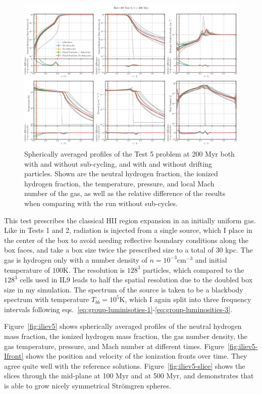 \begin{figure}
\centering
\includegraphics[width=\textwidth]{figures/RHD/Iliev5/compare_profiles_0020-RelativeDifferences.png}
\caption{
Spherically averaged profiles of the Test 5 problem at 200 Myr both with and without sub-cycling,
and with and without drifting particles. Shown are the neutral hydrogen fraction, the ionized
hydrogen fraction, the temperature, pressure, and local Mach number of the gas, as well as the
relative difference of the results when comparing with the run without sub-cycles.
}
\label{fig:iliev5-subcycling}
\end{figure}


This test prescribes the classical HII region expansion in an initially uniform gas. Like
in Tests 1 and 2, radiation is injected from a single source, which I place in the center of the
box to avoid needing reflective boundary conditions along the box faces, and take a box size twice
the prescribed size to a total of $30$ kpc. The gas is hydrogen only with a number density of $n =
10^{-3}$cm$^{-3}$ and initial temperature of $100$K. The resolution is $128^3$ particles, which
compared to the $128^3$ cells used in IL9 leads to half the spatial resolution due to the doubled
box size in my simulation. The spectrum of the source is taken to be a blackbody spectrum with
temperature $T_{bb} = 10^5$K, which I again split into three frequency intervals following
eqs.~\ref{eq:group-luminisoties-1}-\ref{eq:group-luminosities-3}.

Figure~\ref{fig:iliev5} shows spherically averaged profiles of the neutral hydrogen mass fraction,
the ionized hydrogen mass fraction, the gas number density, the gas temperature, pressure, and Mach
number at different times. Figure~\ref{fig:iliev5-Ifront} shows the position and velocity of
the ionization fronts over time. They agree quite well with the reference solutions.
Figure~\ref{fig:iliev5-slice} shows the slices through the mid-plane at 100 Myr and at 500 Myr, and
demonstrates that \GEARRT is able to grow nicely symmetrical Str\"omgren spheres.

